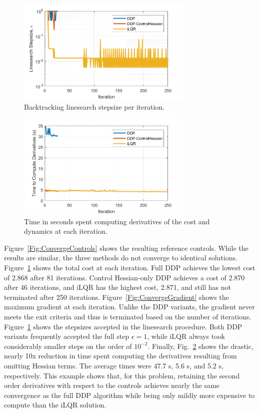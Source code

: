 \begin{figure}[h!]
	\centering
	\includegraphics[width=0.75\textwidth]{Images/Convergence/alpha}
	\caption{Backtracking linesearch stepsize per iteration.}
	\label{Fig:ConvergeStepsize}
\end{figure}
\begin{figure}[h!]
	\centering
	\includegraphics[width=0.75\textwidth]{Images/Convergence/time_derivs}
	\caption{Time in seconds spent computing derivatives of the cost and dynamics at each iteration.}
	\label{Fig:ConvergeTime}
\end{figure}
Figure~\ref{Fig:ConvergeControls} shows the resulting reference controls. While the results are similar, the three methods do not converge to identical solutions. 
Figure~\ref{Fig:ConvergeStepsize} shows the total cost at each iteration. Full DDP achieves the lowest cost of 2.868 after 81 iterations. Control Hessian-only DDP achieves a cost of 2.870 after 46 iterations, and iLQR has the highest cost, 2.871, and still has not terminated after 250 iterations. Figure~\ref{Fig:ConvergeGradient} shows the maximum gradient at each iteration. Unlike the DDP variants, the gradient never meets the exit criteria and thus is terminated based on the number of iterations. 
Figure~\ref{Fig:ConvergeStepsize} shows the stepsizes accepted in the linesearch procedure. Both DDP variants frequently accepted the full step $\epsilon=1$, while iLQR always took considerably smaller steps on the order of $ 10^{-2} $. Finally, Fig.~\ref{Fig:ConvergeTime} shows the drastic, nearly 10x reduction in time spent computing the derivatives resulting from omitting Hessian terms. The average times were $47.7$ s, 5.6 s, and 5.2 s, respectively. 
This example shows that, for this problem, retaining the second order derivatives with respect to the controls achieves nearly the same convergence as the full DDP algorithm while being only mildly more expensive to compute than the iLQR solution. 

